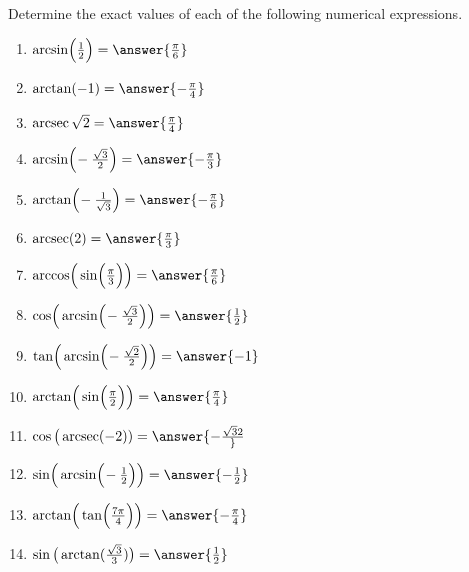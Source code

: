 \documentclass{ximera}
\author{Elizabeth Campolongo}
\begin{document}
\begin{exercise}

Determine the exact values of each of the following numerical expressions.  %
%
\begin{enumerate}
\item $\arcsin\!\Big(\frac{1}{2}\Big) = \answer{\frac{\pi}{6}}$
%
\item $\arctan(-1) = \answer{-\frac{\pi}{4}}$
%
\item $\arcsec{\sqrt{2}} = \answer{\frac{\pi}{4}}$
%
\item $\arcsin\!\Big(\!-\frac{\sqrt{3}}{2}\Big) = \answer{-\frac{\pi}{3}}$
%
\item $\arctan\!\Big(\!-\frac{1}{\sqrt{3}}\Big) = \answer{-\frac{\pi}{6}}$
%
\item $\arcsec(2) = \answer{\frac{\pi}{3}}$
%
\item $\arccos\!\Big(\sin\!\Big(\frac{\pi}{3}\Big)\Big) = \answer{\frac{\pi}{6}}$
%
\item $\cos\!\Big(\arcsin\!\Big(\!-\frac{\sqrt{3}}{2}\Big)\Big) = \answer{\frac{1}{2}}$
%
\item $\tan\!\Big(\arcsin\!\Big(\!-\frac{\sqrt{2}}{2}\Big)\Big) = \answer{-1}$
%
\item $\arctan\!\Big(\sin\!\Big(\frac{\pi}{2}\Big)\Big) = \answer{\frac{\pi}{4}}$
%
\item $\cos\big(\arcsec(-2)) = \answer{-\frac{\sqrt{3}{2}}}$
%
\item $\sin\!\Big(\arcsin\!\Big(\!-\frac{1}{2}\Big)\Big) = \answer{-\frac{1}{2}}$
%
\item $\arctan\!\Big(\tan\!\Big(\frac{7\pi}{4}\Big)\Big) = \answer{-\frac{\pi}{4}}$
%
\item $\sin\big(\arctan(\frac{\sqrt{3}}{3})\big) = \answer{\frac{1}{2}}$
%
\end{enumerate}
\end{exercise}
\end{document}
